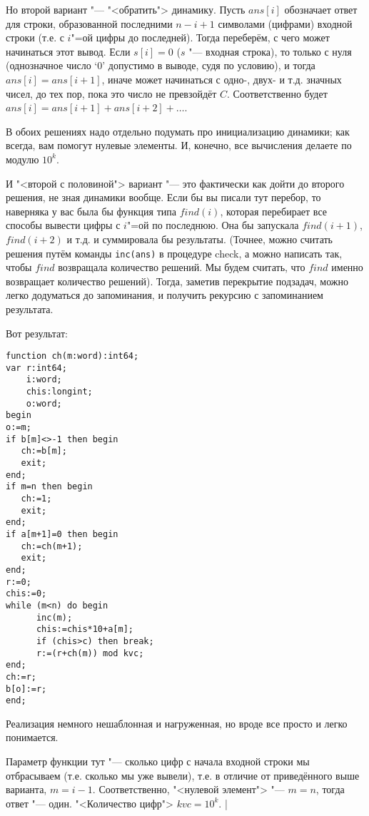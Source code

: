 Но второй вариант "--- "<обратить"> динамику. Пусть $ans[i]$ обозначает ответ для строки, 
образованной последними $n-i+1$ символами (цифрами) входной строки (т.е. с $i$"=ой цифры до 
последней). Тогда переберём, с чего может начинаться этот вывод. Если $s[i]=0$ ($s$ "--- входная 
строка), то только с нуля (однозначное число `0' допустимо в выводе, судя по условию), и тогда 
$ans[i]=ans[i+1]$, иначе может начинаться с одно-, двух- и т.д. значных чисел, до тех пор, пока это 
число не превзойдёт $C$. Соответственно будет $ans[i]=ans[i+1]+ans[i+2]+\dots$.

В обоих решениях надо отдельно подумать про инициализацию динамики; как всегда, вам помогут нулевые 
элементы. И, конечно, все вычисления делаете по модулю $10^k$.

И "<второй с половиной"> вариант "--- это фактически как дойти до второго решения, не зная динамики 
вообще. Если бы вы писали тут перебор, то наверняка у вас была бы функция типа $find(i)$, которая 
перебирает все способы вывести цифры с $i$"=ой по последнюю. Она бы запускала $find(i+1)$, 
$find(i+2)$ и т.д. и суммировала бы результаты. (Точнее, можно считать решения путём команды 
\texttt{inc(ans)} в процедуре check, а можно написать так, чтобы $find$ возвращала количество 
решений. Мы будем считать, что $find$ именно возвращает количество решений). Тогда, заметив 
перекрытие подзадач, можно легко додуматься до запоминания, и получить рекурсию с запоминанием 
результата.


Вот результат:
\begin{codesample}\begin{verbatim}
function ch(m:word):int64;
var r:int64;
    i:word;
    chis:longint;
    o:word;
begin
o:=m;
if b[m]<>-1 then begin
   ch:=b[m];
   exit;
end;
if m=n then begin
   ch:=1;
   exit;
end;
if a[m+1]=0 then begin
   ch:=ch(m+1);
   exit;
end;
r:=0;
chis:=0;
while (m<n) do begin
      inc(m);
      chis:=chis*10+a[m];
      if (chis>c) then break;
      r:=(r+ch(m)) mod kvc;
end;
ch:=r;
b[o]:=r;
end;
\end{verbatim}\end{codesample}
Реализация немного нешаблонная и нагруженная, но вроде все просто и легко понимается.
 
 Параметр функции 
тут "--- сколько цифр с начала входной строки мы отбрасываем (т.е. сколько мы уже вывели), т.е. в 
отличие от приведённого выше варианта, $m=i-1$. Соответственно, "<нулевой элемент"> "--- $m=n$, 
тогда ответ "--- один. "<Количество цифр"> $kvc=10^k$.
|

